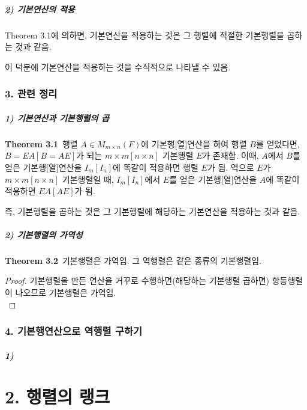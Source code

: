\documentclass[10pt, a4paper]{article}
\begin{document}
\subsubsection*{2) 기본연산의 적용}
Theorem 3.1에 의하면, 기본연산을 적용하는 것은 그 행렬에 적절한 기본행렬을 곱하는 것과 같음.

이 덕분에 기본연산을 적용하는 것을 수식적으로 나타낼 수 있음.


\newpage


\section*{3. 관련 정리}
\subsubsection*{1) 기본연산과 기본행렬의 곱}
\textbf{Theorem 3.1}\, 행렬 $A \in M_{m \times n}(F)$에 기본행[열]연산을 하여 행렬 $B$를 얻었다면, $B=EA[B=AE]$가 되는 $m \times m[n \times n]$ 기본행렬 $E$가 존재함. 이때, $A$에서 $B$를 얻은 기본행[열]연산을 $I_m[I_n]$에 똑같이 적용하면 행렬 $E$가 됨. 역으로 $E$가 $m \times m[n \times n]$ 기본행렬일 때, $I_m[I_n]$에서 $E$를 얻은 기본행[열]연산을 $A$에 똑같이 적용하면 $EA[AE]$가 됨.

즉, 기본행렬을 곱하는 것은 그 기본행렬에 해당하는 기본연산을 적용하는 것과 같음.

\subsubsection*{2) 기본행렬의 가역성}
\textbf{Theorem 3.2}\, 기본행렬은 가역임. 그 역행렬은 같은 종류의 기본행렬임.

\begin{proof}
기본행렬을 만든 연산을 거꾸로 수행하면(해당하는 기본행렬 곱하면) 항등행렬이 나오므로 기본행렬은 가역임.\\
\end{proof}


\section*{4. 기본행연산으로 역행렬 구하기}

\subsubsection*{1) }


\newpage


\part*{2. 행렬의 랭크}
\end{document}
